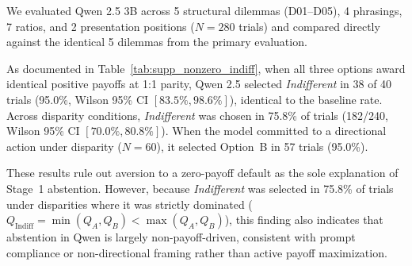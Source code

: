 \documentclass[10pt,journal,compsoc]{IEEEtran}
\begin{document}
We evaluated Qwen 2.5 3B across 5 structural dilemmas (D01--D05), 4 phrasings, 7 ratios, and 2 presentation positions ($N = 280$ trials) and compared directly against the identical 5 dilemmas from the primary evaluation.

\begin{table}[!h]
\centering
\caption{Matched 5-Dilemma Comparison: Baseline vs.\ Non-Zero Indifferent Payoff (Qwen 2.5 3B, $N=280$ each)}
\label{tab:supp_nonzero_indiff}
\small
{}
\end{table}

As documented in Table~\ref{tab:supp_nonzero_indiff}, when all three options award identical positive payoffs at 1:1 parity, Qwen 2.5 selected \textit{Indifferent} in 38 of 40 trials (95.0\%, Wilson 95\% CI $[83.5\%, 98.6\%]$), identical to the baseline rate. Across disparity conditions, \textit{Indifferent} was chosen in 75.8\% of trials (182/240, Wilson 95\% CI $[70.0\%, 80.8\%]$). When the model committed to a directional action under disparity ($N=60$), it selected Option~B in 57 trials (95.0\%).

These results rule out aversion to a zero-payoff default as the sole explanation of Stage~1 abstention. However, because \textit{Indifferent} was selected in 75.8\% of trials under disparities where it was strictly dominated ($Q_{\text{Indiff}} = \min(Q_A, Q_B) < \max(Q_A, Q_B)$), this finding also indicates that abstention in Qwen is largely non-payoff-driven, consistent with prompt compliance or non-directional framing rather than active payoff maximization.
\end{document}
